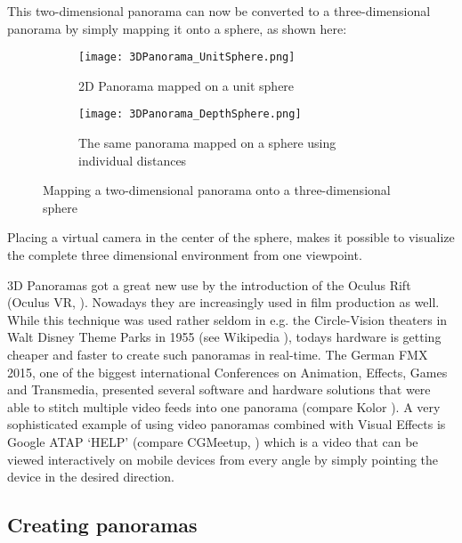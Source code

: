 This two-dimensional panorama can now be converted to a three-dimensional panorama by simply mapping it onto a sphere, as shown here:

\pagestyle{fancy}

\begin{figure}[h]
	\centering
	\begin{subfigure}[b]{0.45\textwidth}
		\centering
		\texttt{[image: 3DPanorama\_UnitSphere.png]}
		\caption{2D Panorama mapped on a unit sphere}
		\label{fig:3d_panorama_unit_sphere}
	\end{subfigure}
	\hfill
	\begin{subfigure}[b]{0.45\textwidth}
		\centering
		\texttt{[image: 3DPanorama\_DepthSphere.png]}
		\caption{The same panorama mapped on a sphere using individual distances}
		\label{fig:3d_panorama_depth_sphere}
	\end{subfigure}

	\caption{Mapping a two-dimensional panorama onto a three-dimensional sphere}
	\label{fig:3d_panorama}
\end{figure}

Placing a virtual camera in the center of the sphere, makes it possible to visualize the complete three dimensional environment from one viewpoint.

3D Panoramas got a great new use by the introduction of the Oculus Rift  (Oculus VR, \parencite{OculusVR}). Nowadays they are increasingly used in film production as well. While this technique was used rather seldom in e.g. the Circle-Vision theaters in Walt Disney Theme Parks in 1955 (see Wikipedia \parencite{wiki:CircleVision}), todays hardware is getting cheaper and faster to create such panoramas in real-time. The German FMX 2015, one of the biggest international Conferences on Animation, Effects, Games and Transmedia, presented several software and hardware solutions that were able to stitch multiple video feeds into one panorama (compare Kolor \parencite{kolorGoPro}). A very sophisticated example of using video panoramas combined with Visual Effects is Google ATAP ‘HELP’ (compare CGMeetup, \parencite{googleATAPHelp}) which is a video that can be viewed interactively on mobile devices from every angle by simply pointing the device in the desired direction.

\subsection{Creating panoramas} \label{section_creating_panoramas}


